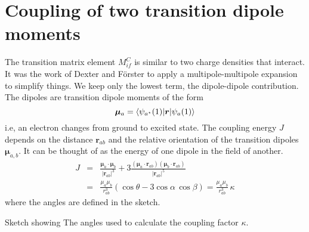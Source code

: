 \section{Coupling of two transition dipole moments}

The transition matrix element $M_{if}^C$ is similar to two charge densities that interact. It was the work of Dexter and Förster to apply a multipole-multipole expansion to simplify things. We keep only the lowest term, the dipole-dipole contribution. The dipoles are transition dipole moments of the form
\begin{equation}
   \boldsymbol{\mu}_a = \braket{ \psi_{a^\star}(1)| \boldsymbol{r} |  \psi_{a}(1) }
\end{equation}
i.e, an electron changes from ground to excited state.
%
The coupling energy $J$ depends on the distance $\boldsymbol{r}_{ab}$ and the relative orientation of the transition dipoles $\boldsymbol{\mu}_{a,b}$. It can be thought of as the energy of one dipole in the field of another.
\begin{eqnarray}
 J & = & \frac{\boldsymbol{\mu}_a \cdot \boldsymbol{\mu}_b }{|\boldsymbol{r}_{ab}|^3} 
  + 3 \frac{ (\boldsymbol{\mu}_a \cdot \boldsymbol{r}_{ab}) (\boldsymbol{\mu}_b \cdot \boldsymbol{r}_{ab})
  }{ |\boldsymbol{r}_{ab}|^5 } \\
   & = & \frac{\mu_a \mu_b }{r_{ab}^3} \left( \cos \theta - 3 \cos \alpha \, \cos \beta \right) = \frac{\mu_a \mu_b }{r_{ab}^3} \, \kappa  
\end{eqnarray}
where the angles are defined in the sketch.

\begin{marginfigure}

\caption{Sketch showing 
The angles used to calculate the coupling factor $\kappa$.}
\end{marginfigure}


